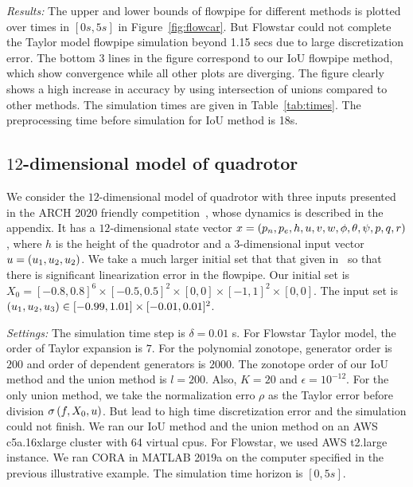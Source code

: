 \emph{Results:}  The upper and lower bounds of flowpipe for different
  methods is plotted over times in $[0 s,5 s]$ in
  Figure~\ref{fig:flowcar}.  But Flowstar could not complete the Taylor
  model flowpipe simulation beyond 1.15 secs due to large
  discretization error.  The bottom 3 lines in the figure correspond
  to our IoU flowpipe method, which show convergence while all other
  plots are diverging.  The figure clearly shows a high increase in
  accuracy by using intersection of unions compared to other methods.
  The simulation times are given in Table~\ref{tab:times}.  The
  preprocessing time before simulation for IoU method is 18s.
\subsection{$12$-dimensional model of quadrotor}
We consider the $12$-dimensional model of quadrotor with three inputs
presented in the ARCH 2020 friendly
competition~\cite{geretti2020arch}, whose dynamics is described in the
appendix.  It has a $12$-dimensional state vector $x
= \left(p_n,p_e,h,u,v,w,\phi,\theta,\psi,p,q,r\right)$, where $h$ is the
height of the quadrotor and a $3$-dimensional input vector $u
= \left(u_1,u_2,u_2\right)$.  We take a much larger initial set that that
given in~\cite{geretti2020arch} so that there is significant
linearization error in the flowpipe.  Our initial set is $X_0 =
[-0.8,0.8]^6\times[-0.5,0.5]^2\times[0,0]\times [-1,1]^2\times[0,0]$.
The input set is $\left(u_1,u_2,u_3\right)\in
[-0.99,1.01]\times[-0.01,0.01]^2$.

\emph{Settings:}  The simulation time step is $\delta = 0.01$ s.  For
  Flowstar Taylor model, the order of Taylor expansion is $7$.  For
  the polynomial zonotope, generator order is $200$ and order of
  dependent generators is $2000$.  The zonotope order of our IoU
  method and the union method is $l=200$.  Also, $K = 20$ and
  $\epsilon = 10^{-12}$.  For the only union method, we take the
  normalization erro $\rho$ as the Taylor error before division
  $\sigma\left(f,X_0,u\right)$.  But lead to high time discretization error
  and the simulation could not finish.  We ran our IoU method and the
  union method on an AWS c5a.16xlarge cluster with 64 virtual cpus.
  For Flowstar, we used AWS t2.large instance.  We ran CORA in MATLAB
  2019a on the computer specified in the previous illustrative
  example.  The simulation time horizon is $[0, 5 s]$.

